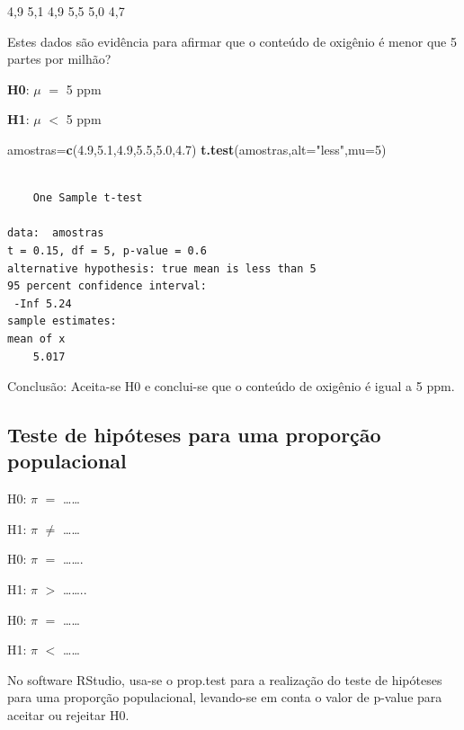 \documentclass[12pt,brazil,]{book}
\newenvironment{Shaded}{\begin{snugshade}}{\end{snugshade}}
\newcommand{\DataTypeTok}[1]{\textcolor[rgb]{0.13,0.29,0.53}{#1}}
\newcommand{\DecValTok}[1]{\textcolor[rgb]{0.00,0.00,0.81}{#1}}
\newcommand{\FloatTok}[1]{\textcolor[rgb]{0.00,0.00,0.81}{#1}}
\newcommand{\KeywordTok}[1]{\textcolor[rgb]{0.13,0.29,0.53}{\textbf{#1}}}
\newcommand{\NormalTok}[1]{#1}
\newcommand{\StringTok}[1]{\textcolor[rgb]{0.31,0.60,0.02}{#1}}
\begin{document}
4,9 5,1 4,9 5,5 5,0 4,7

Estes dados são evidência para afirmar que o conteúdo de oxigênio é
menor que 5 partes por milhão?

\textbf{H0}: \(\mu\) \(=\) 5 ppm

\textbf{H1}: \(\mu\) \(<\) 5 ppm

\begin{Shaded}
\begin{Highlighting}[]
\NormalTok{amostras=}\KeywordTok{c}\NormalTok{(}\FloatTok{4.9}\NormalTok{,}\FloatTok{5.1}\NormalTok{,}\FloatTok{4.9}\NormalTok{,}\FloatTok{5.5}\NormalTok{,}\FloatTok{5.0}\NormalTok{,}\FloatTok{4.7}\NormalTok{)}
\KeywordTok{t.test}\NormalTok{(amostras,}\DataTypeTok{alt=}\StringTok{"less"}\NormalTok{,}\DataTypeTok{mu=}\DecValTok{5}\NormalTok{)}
\end{Highlighting}
\end{Shaded}

\begin{verbatim}

    One Sample t-test

data:  amostras
t = 0.15, df = 5, p-value = 0.6
alternative hypothesis: true mean is less than 5
95 percent confidence interval:
 -Inf 5.24
sample estimates:
mean of x 
    5.017 
\end{verbatim}

Conclusão: Aceita-se H0 e conclui-se que o conteúdo de oxigênio é igual
a 5 ppm.

\hypertarget{teste-de-hipoteses-para-uma-proporcao-populacional}{%
\subsection{Teste de hipóteses para uma proporção
populacional}\label{teste-de-hipoteses-para-uma-proporcao-populacional}}

H0: \(\pi\) \(=\) \ldots{}\ldots{}

H1: \(\pi\) \(\neq\) \ldots{}\ldots{}

H0: \(\pi\) \(=\) \ldots{}\ldots{}.

H1: \(\pi\) \(>\) \ldots{}\ldots{}..

H0: \(\pi\) \(=\) \ldots{}\ldots{}

H1: \(\pi\) \(<\) \ldots{}\ldots{}

No software RStudio, usa-se o prop.test para a realização do teste de
hipóteses para uma proporção populacional, levando-se em conta o valor
de p-value para aceitar ou rejeitar H0.
\end{document}

